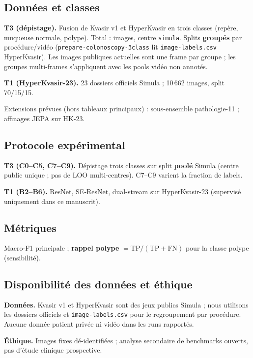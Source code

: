 \subsection{Données et classes}
\label{sec:data}

\textbf{T3 (dépistage).}
Fusion de Kvasir v1 et HyperKvasir en trois classes (repère, muqueuse normale, polype).
Total : \numsamples{} images, centre \texttt{simula}.
Splits \textbf{groupés} par procédure/vidéo (\texttt{prepare-colonoscopy-3class} lit \texttt{image-labels.csv} HyperKvasir).
Les images publiques actuelles sont une frame par groupe ; les groupes multi-frames s'appliquent avec les pools vidéo non annotés.

\textbf{T1 (HyperKvasir-23).}
23 dossiers officiels Simula ; 10\,662 images, split 70/15/15.

Extensions prévues (hors tableaux principaux) : sous-ensemble pathologie-11 ; affinages JEPA sur HK-23.

\subsection{Protocole expérimental}
\label{sec:protocol}

\textbf{T3 (C0--C5, C7--C9).} Dépistage trois classes sur split \textbf{poolé} Simula (centre public unique ; pas de LOO multi-centres). C7--C9 varient la fraction de labels.

\textbf{T1 (B2--B6).} ResNet, SE-ResNet, dual-stream sur HyperKvasir-23 (supervisé uniquement dans ce manuscrit).

\subsection{Métriques}
Macro-F1 principale ; \textbf{rappel polype} $= \mathrm{TP}/(\mathrm{TP}+\mathrm{FN})$ pour la classe polype (sensibilité).

\subsection{Disponibilité des données et éthique}
\label{sec:ethics}

\textbf{Données.} Kvasir v1 et HyperKvasir sont des jeux publics Simula ; nous utilisons les dossiers officiels et \texttt{image-labels.csv} pour le regroupement par procédure.
Aucune donnée patient privée ni vidéo dans les runs rapportés.

\textbf{Éthique.} Images fixes dé-identifiées ; analyse secondaire de benchmarks ouverts, pas d'étude clinique prospective.
